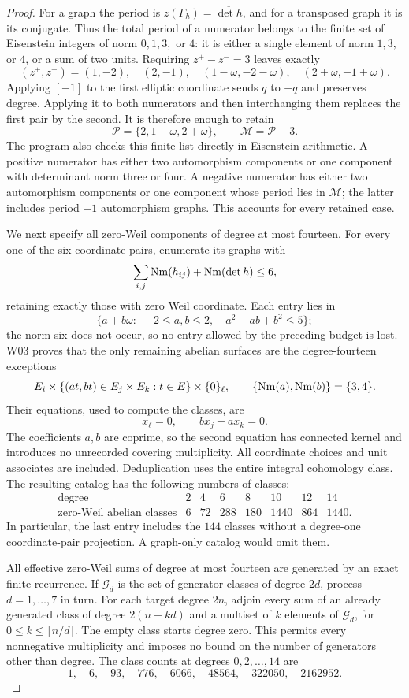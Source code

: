 \begin{proof}
For a graph the period is $z(\Gamma_h)=\overline{\det h}$, and for a transposed graph it is its conjugate. Thus the total period of a numerator belongs to the finite set of Eisenstein integers of norm $0,1,3,$ or $4$: it is either a single element of norm $1,3,$ or $4$, or a sum of two units. Requiring $z^+-z^-=3$ leaves exactly
\[
(z^+,z^-)=
(1,-2),\quad(2,-1),\quad
(1-\omega,-2-\omega),\quad(2+\omega,-1+\omega).
\]
Applying $[-1]$ to the first elliptic coordinate sends $q$ to $-q$ and preserves degree. Applying it to both numerators and then interchanging them replaces the first pair by the second. It is therefore enough to retain
\[
\mathcal P=\{2,1-\omega,2+\omega\},\qquad
\mathcal M=\mathcal P-3.
\]
The program also checks this finite list directly in Eisenstein arithmetic. A positive numerator has either two automorphism components or one component with determinant norm three or four. A negative numerator has either two automorphism components or one component whose period lies in $\mathcal M$; the latter includes period $-1$ automorphism graphs. This accounts for every retained case.

We next specify all zero-Weil components of degree at most fourteen. For every one of the six coordinate pairs, enumerate its graphs with
\[
\sum_{i,j}\operatorname{Nm}(h_{ij})+\operatorname{Nm}(\det h)\leq6,
\]
retaining exactly those with zero Weil coordinate. Each entry lies in
\[
\{a+b\omega:\ -2\leq a,b\leq2,\quad a^2-ab+b^2\leq5\};
\]
the norm six does not occur, so no entry allowed by the preceding budget is lost. W03 proves that the only remaining abelian surfaces are the degree-fourteen exceptions
\[
E_i\times\{(a t,b t)\in E_j\times E_k:t\in E\}\times\{0\}_{\ell},
\qquad\{\operatorname{Nm}(a),\operatorname{Nm}(b)\}=\{3,4\}.
\]
Their equations, used to compute the classes, are
\[
x_\ell=0,\qquad b x_j-a x_k=0.
\]
The coefficients $a,b$ are coprime, so the second equation has connected kernel and introduces no unrecorded covering multiplicity. All coordinate choices and unit associates are included. Deduplication uses the entire integral cohomology class. The resulting catalog has the following numbers of classes:
\[
\begin{array}{c|rrrrrrr}
\text{degree}&2&4&6&8&10&12&14\\\hline
\text{zero-Weil abelian classes}&6&72&288&180&1440&864&1440.
\end{array}
\]
In particular, the last entry includes the $144$ classes without a degree-one coordinate-pair projection. A graph-only catalog would omit them.

All effective zero-Weil sums of degree at most fourteen are generated by an exact finite recurrence. If $\mathcal G_d$ is the set of generator classes of degree $2d$, process $d=1,\ldots,7$ in turn. For each target degree $2n$, adjoin every sum of an already generated class of degree $2(n-kd)$ and a multiset of $k$ elements of $\mathcal G_d$, for $0\leq k\leq\lfloor n/d\rfloor$. The empty class starts degree zero. This permits every nonnegative multiplicity and imposes no bound on the number of generators other than degree. The class counts at degrees $0,2,\ldots,14$ are
\[
1,\quad6,\quad93,\quad776,\quad6066,\quad48564,\quad322050,\quad2162952.
\]


\end{proof}

